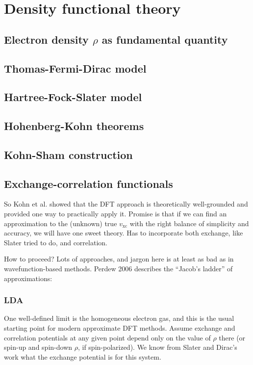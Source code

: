 \documentclass[11pt]{article}
\begin{document}
\section{Density functional theory}
\label{sec:org3815264}
\subsection{Electron density \(\rho\) as fundamental quantity}
\label{sec:org2ed5ccf}
\subsection{Thomas-Fermi-Dirac model}
\label{sec:orgd45f21a}
\subsection{Hartree-Fock-Slater model}
\label{sec:org8459380}
\subsection{Hohenberg-Kohn theorems}
\label{sec:orgbe42cb3}
\subsection{Kohn-Sham construction}
\label{sec:orgcc2f445}
\subsection{Exchange-correlation functionals}
\label{sec:org7d7cb10}
So Kohn et al. showed that the DFT approach is theoretically well-grounded and
provided one way to practically apply it. Promise is that if we can find an
approximation to the (unknown) true \(v_\text{xc}\) with the right balance of simplicity
and accuracy, we will have one sweet theory. Has to incorporate both exchange,
like Slater tried to do, and correlation.

How to proceed? Lots of approaches, and jargon here is at least as bad as in
wavefunction-based methods. Perdew 2006 describes the ``Jacob's ladder'' of
approximations:
\subsubsection{LDA}
\label{sec:org94d708d}
One well-defined limit is the homogeneous electron gas, and this is the usual
starting point for modern approximate DFT methods. Assume exchange and
correlation potentials at any given point depend only on the value of \(\rho\) there
(or spin-up and spin-down \(\rho\), if spin-polarized). We know from Slater and
Dirac's work what the exchange potential is for this system.
\end{document}
